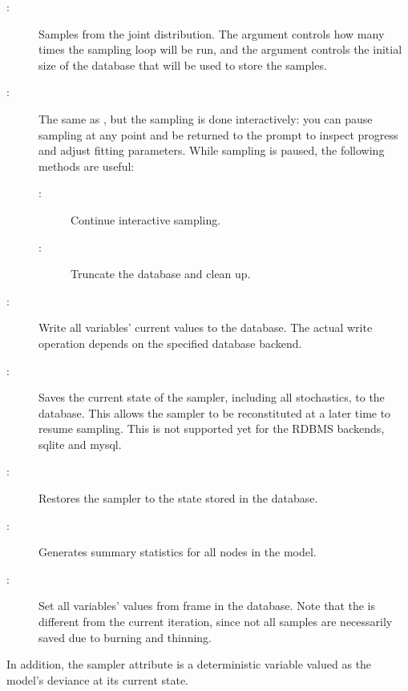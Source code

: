 \documentclass[]{jss}
\begin{document}
\begin{description}
    \item[:] Samples from the joint distribution. The  argument controls how many times the sampling loop will be run, and the  argument controls the initial size of the database that will be used to store the samples.
    \item[:] The same as , but the sampling is done interactively: you can pause sampling at any point and be returned to the  prompt to inspect progress and adjust fitting parameters. While sampling is paused, the following methods are useful:
    \begin{description}
        \item[:] Continue interactive sampling.
        \item[:] Truncate the database and clean up.
    \end{description}
    \item[:] Write all variables' current values to the database. The actual write operation depends on the specified database backend.
    \item[:] Saves the current state of the sampler, including all stochastics, to the database. This allows the sampler to be reconstituted at a later time to resume sampling. This is not supported yet for the RDBMS backends, sqlite and mysql.
    \item[:] Restores the sampler to the state stored in the database.
   \item[:] Generates summary statistics for all nodes in the model.
    \item[:] Set all variables' values from frame  in the database. Note that the  is different from the current iteration, since not all samples are necessarily saved due to burning and thinning.
\end{description}

In addition, the sampler attribute  is a deterministic variable valued as the model's deviance at its current state.
\end{document}
